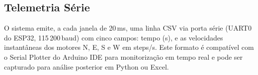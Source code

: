 \subsection{Telemetria Série}
\label{subsec:telemetria}

O sistema emite, a cada janela de 20\,ms, uma linha CSV via porta série (UART0 do ESP32, 115\,200\,baud) com cinco campos: tempo (s), e as velocidades instantâneas dos motores N, E, S e W em steps/s. Este formato é compatível com o Serial Plotter do Arduino IDE para monitorização em tempo real e pode ser capturado para análise posterior em Python ou Excel.
